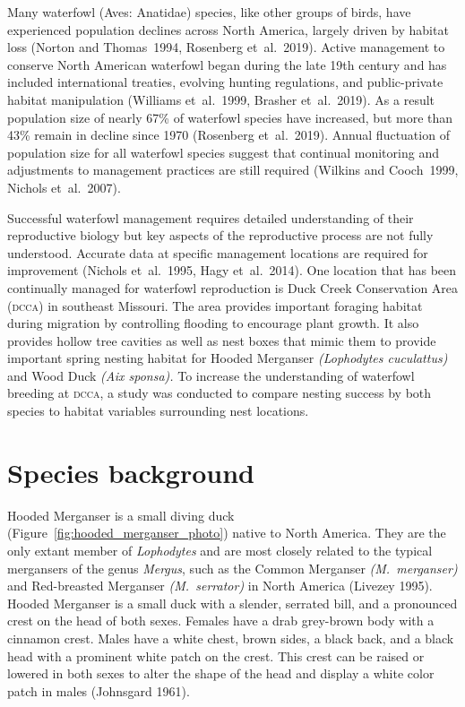 
Many waterfowl (Aves: Anatidae) species, like other groups of birds, have experienced population declines across North America, largely driven by habitat loss (Norton and Thomas~1994, Rosenberg et~al.~2019).  Active management to conserve North American waterfowl began during the late 19th century and has included international treaties, evolving hunting regulations, and public-private habitat manipulation (Williams et~al.~1999, Brasher et~al.~2019). As a result population size of nearly 67\% of waterfowl species have increased, but more than 43\% remain in decline since 1970 (Rosenberg et~al.~2019). Annual fluctuation of population size for all waterfowl species suggest that continual monitoring and adjustments to management practices are still required  (Wilkins and Cooch~1999, Nichols et~al.~2007). 

Successful waterfowl management requires detailed understanding of their reproductive biology but key aspects of the reproductive process are not fully understood. Accurate data at specific management locations are required for improvement (Nichols et~al.~1995, Hagy et~al.~2014). One location that has been continually managed for waterfowl reproduction is Duck Creek Conservation Area \textsc{(dcca)} in southeast Missouri. The area provides important foraging habitat during migration by controlling flooding to encourage plant growth. It also provides hollow tree cavities as well as nest boxes that mimic them to provide important spring nesting habitat for Hooded Merganser \textit{(Lophodytes cuculattus)} and Wood Duck \textit{(Aix sponsa).} To increase the understanding of waterfowl breeding at \textsc{dcca}, a study was conducted to compare nesting success by both species to habitat variables surrounding nest locations.  



\section*{Species background}

Hooded Merganser is a small diving duck (Figure~\ref{fig:hooded_merganser_photo}) native to North America. They are the only extant member of \textit{Lophodytes} and are most closely related to the typical mergansers of the genus \textit{Mergus}, such as the Common Merganser \textit{(M.~merganser)} and Red-breasted Merganser \textit{(M.~serrator)} in North America (Livezey 1995). Hooded Merganser is a small duck with a slender, serrated bill, and a pronounced crest on the head of both sexes. Females have a drab grey-brown body with a cinnamon crest. Males have a white chest, brown sides, a black back, and a black head with a prominent white patch on the crest. This crest can be raised or lowered in both sexes to alter the shape of the head and display a white color patch in males (Johnsgard 1961). 


